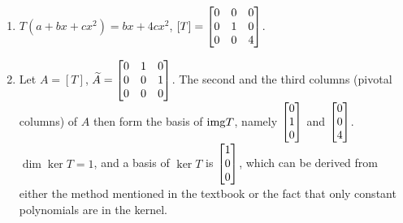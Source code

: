 \documentclass{article}
\begin{document}
\begin{exercise}{9}
\begin{enumerate}
\item $T(a+bx+cx^2) = bx+4cx^2$, $[T] = \begin{bmatrix}0&0&0\\0&1&0\\0&0&4\end{bmatrix}$.
\item Let $A = [T]$, $\widetilde{A} = \begin{bmatrix}0&1&0\\0&0&1\\0&0&0\end{bmatrix}$. The second and the third columns (pivotal columns) of $A$ then form the basis of $\mathrm{img} T$, namely $\begin{bmatrix}0\\1\\0\end{bmatrix}$ and $\begin{bmatrix}0\\0\\4\end{bmatrix}$. $\dim{\ker T} = 1$, and a basis of $\ker T$ is $\begin{bmatrix}1\\0\\0\end{bmatrix}$, which can be derived from either the method mentioned in the textbook or the fact that only constant polynomials are in the kernel.
\end{enumerate}
\end{exercise}
\end{document}
